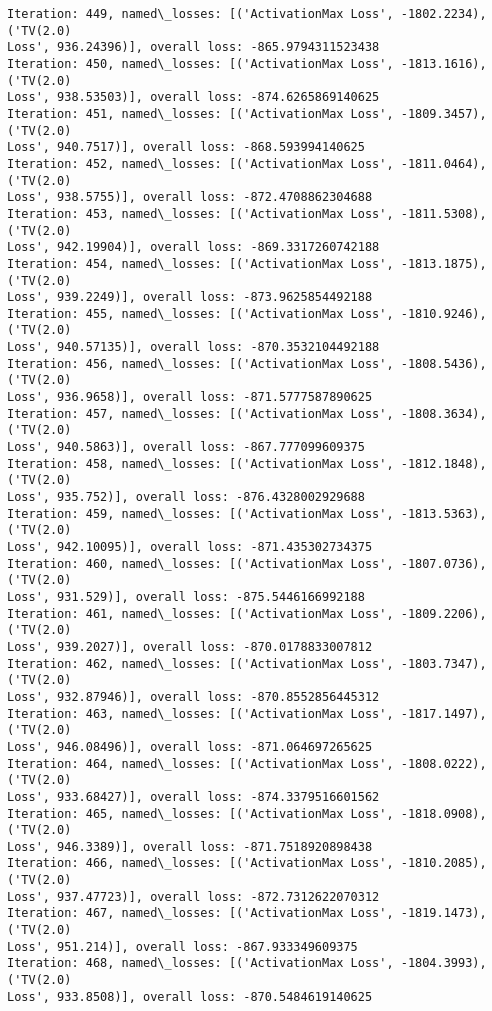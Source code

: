 \documentclass[10pt]{article}
\begin{document}
\begin{Verbatim}[commandchars=\\\{\}]
Iteration: 449, named\_losses: [('ActivationMax Loss', -1802.2234), ('TV(2.0)
Loss', 936.24396)], overall loss: -865.9794311523438
Iteration: 450, named\_losses: [('ActivationMax Loss', -1813.1616), ('TV(2.0)
Loss', 938.53503)], overall loss: -874.6265869140625
Iteration: 451, named\_losses: [('ActivationMax Loss', -1809.3457), ('TV(2.0)
Loss', 940.7517)], overall loss: -868.593994140625
Iteration: 452, named\_losses: [('ActivationMax Loss', -1811.0464), ('TV(2.0)
Loss', 938.5755)], overall loss: -872.4708862304688
Iteration: 453, named\_losses: [('ActivationMax Loss', -1811.5308), ('TV(2.0)
Loss', 942.19904)], overall loss: -869.3317260742188
Iteration: 454, named\_losses: [('ActivationMax Loss', -1813.1875), ('TV(2.0)
Loss', 939.2249)], overall loss: -873.9625854492188
Iteration: 455, named\_losses: [('ActivationMax Loss', -1810.9246), ('TV(2.0)
Loss', 940.57135)], overall loss: -870.3532104492188
Iteration: 456, named\_losses: [('ActivationMax Loss', -1808.5436), ('TV(2.0)
Loss', 936.9658)], overall loss: -871.5777587890625
Iteration: 457, named\_losses: [('ActivationMax Loss', -1808.3634), ('TV(2.0)
Loss', 940.5863)], overall loss: -867.777099609375
Iteration: 458, named\_losses: [('ActivationMax Loss', -1812.1848), ('TV(2.0)
Loss', 935.752)], overall loss: -876.4328002929688
Iteration: 459, named\_losses: [('ActivationMax Loss', -1813.5363), ('TV(2.0)
Loss', 942.10095)], overall loss: -871.435302734375
Iteration: 460, named\_losses: [('ActivationMax Loss', -1807.0736), ('TV(2.0)
Loss', 931.529)], overall loss: -875.5446166992188
Iteration: 461, named\_losses: [('ActivationMax Loss', -1809.2206), ('TV(2.0)
Loss', 939.2027)], overall loss: -870.0178833007812
Iteration: 462, named\_losses: [('ActivationMax Loss', -1803.7347), ('TV(2.0)
Loss', 932.87946)], overall loss: -870.8552856445312
Iteration: 463, named\_losses: [('ActivationMax Loss', -1817.1497), ('TV(2.0)
Loss', 946.08496)], overall loss: -871.064697265625
Iteration: 464, named\_losses: [('ActivationMax Loss', -1808.0222), ('TV(2.0)
Loss', 933.68427)], overall loss: -874.3379516601562
Iteration: 465, named\_losses: [('ActivationMax Loss', -1818.0908), ('TV(2.0)
Loss', 946.3389)], overall loss: -871.7518920898438
Iteration: 466, named\_losses: [('ActivationMax Loss', -1810.2085), ('TV(2.0)
Loss', 937.47723)], overall loss: -872.7312622070312
Iteration: 467, named\_losses: [('ActivationMax Loss', -1819.1473), ('TV(2.0)
Loss', 951.214)], overall loss: -867.933349609375
Iteration: 468, named\_losses: [('ActivationMax Loss', -1804.3993), ('TV(2.0)
Loss', 933.8508)], overall loss: -870.5484619140625

\end{Verbatim}
\end{document}
